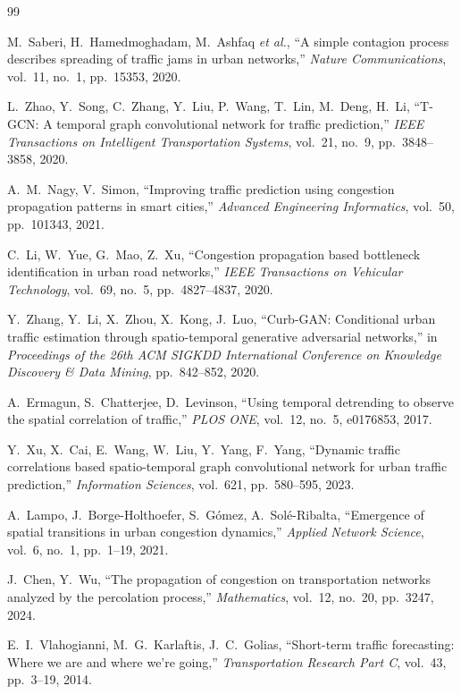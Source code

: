 \begin{thebibliography}{99}

M.~Saberi, H.~Hamedmoghadam, M.~Ashfaq \textit{et al.},
``A simple contagion process describes spreading of traffic jams in urban networks,''
\textit{Nature Communications}, vol.~11, no.~1, pp.~15353, 2020.

L.~Zhao, Y.~Song, C.~Zhang, Y.~Liu, P.~Wang, T.~Lin, M.~Deng, H.~Li,
``T-GCN: A temporal graph convolutional network for traffic prediction,''
\textit{IEEE Transactions on Intelligent Transportation Systems},
vol.~21, no.~9, pp.~3848--3858, 2020.

A.~M.~Nagy, V.~Simon,
``Improving traffic prediction using congestion propagation patterns in smart cities,''
\textit{Advanced Engineering Informatics},
vol.~50, pp.~101343, 2021.

C.~Li, W.~Yue, G.~Mao, Z.~Xu,
``Congestion propagation based bottleneck identification in urban road networks,''
\textit{IEEE Transactions on Vehicular Technology},
vol.~69, no.~5, pp.~4827--4837, 2020.

Y.~Zhang, Y.~Li, X.~Zhou, X.~Kong, J.~Luo,
``Curb-GAN: Conditional urban traffic estimation through spatio-temporal generative adversarial networks,''
in \textit{Proceedings of the 26th ACM SIGKDD International Conference on Knowledge Discovery \& Data Mining},
pp.~842--852, 2020.

A.~Ermagun, S.~Chatterjee, D.~Levinson,
``Using temporal detrending to observe the spatial correlation of traffic,''
\textit{PLOS ONE},
vol.~12, no.~5, e0176853, 2017.

Y.~Xu, X.~Cai, E.~Wang, W.~Liu, Y.~Yang, F.~Yang,
``Dynamic traffic correlations based spatio-temporal graph convolutional network for urban traffic prediction,''
\textit{Information Sciences},
vol.~621, pp.~580--595, 2023.

A.~Lampo, J.~Borge-Holthoefer, S.~G{\'o}mez, A.~Sol{\'e}-Ribalta,
``Emergence of spatial transitions in urban congestion dynamics,''
\textit{Applied Network Science},
vol.~6, no.~1, pp.~1--19, 2021.

J.~Chen, Y.~Wu,
``The propagation of congestion on transportation networks analyzed by the percolation process,''
\textit{Mathematics},
vol.~12, no.~20, pp.~3247, 2024.

E.~I.~Vlahogianni, M.~G.~Karlaftis, J.~C.~Golias,
``Short-term traffic forecasting: Where we are and where we’re going,''
\textit{Transportation Research Part C},
vol.~43, pp.~3--19, 2014.


\end{thebibliography}
